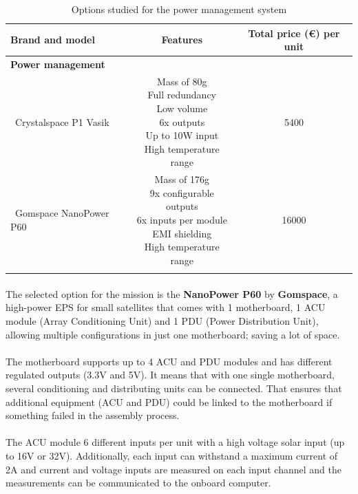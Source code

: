 \begin{longtable}{| l | c | c | }
\hline
\rowcolor[gray]{0.80}	\textbf{Brand and model} &  \textbf{Features}     & \textbf{Total price (\euro) per unit}   \\
\hline
\endfirsthead
\rowcolor[gray]{0.85} \textbf{Power management} &  &  \\
	   ~Crystalspace P1 Vasik & \makecell{Mass of 80g \\ Full redundancy \\ Low volume \\ 6x outputs \\ Up to 10W input \\ High temperature range} & 5400 \\
	\hline
	   ~Gomspace NanoPower P60 & \makecell{Mass of 176g \\ 9x configurable outputs \\ 6x inputs per module \\ EMI shielding \\ High temperature range} & 16000 \\
	\hline
\caption{Options studied for the power management system}
\label{optionspowermanagementsystem}
\end{longtable}

\paragraph{}The selected option for the mission is the \textbf{NanoPower P60} by \textbf{Gomspace}, a high-power EPS for small satellites that comes with 1 motherboard, 1 ACU module (Array Conditioning Unit) and 1 PDU (Power Distribution Unit), allowing multiple configurations in just one motherboard; saving a lot of space.

\paragraph{}The motherboard supports up to 4 ACU and PDU modules and has different regulated outputs (3.3V and 5V). It means that with one single motherboard, several conditioning and distributing units can be connected. That ensures that additional equipment (ACU and PDU) could be linked to the motherboard if something failed in the assembly process.

\paragraph{}The ACU module 6 different inputs per unit with a high voltage solar input (up to 16V or 32V). Additionally, each input can withstand a maximum current of 2A and current and voltage inputs are measured on each input channel and the measurements can be communicated to the onboard computer.

